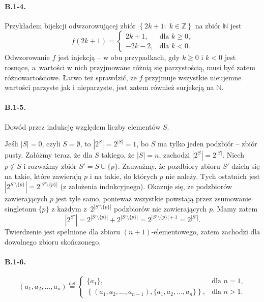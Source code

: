 \paragraph{B.1-4.}
Przykładem bijekcji odwzorowującej zbiór $\left\{2k+1:\;k\in\mathbb{Z}\right\}$ na zbiór $\mathbb{N}$ jest
\[
	f(2k+1) = \left\{\begin{array}{rl}
		2k+1, & \mbox{dla }k\ge 0,\\
		-2k-2, & \mbox{dla }k<0.
	\end{array}\right.
\]
Odwzorowanie $f$ jest injekcją -- w obu przypadkach, gdy $k\ge 0$ i $k<0$ jest rosnące, a~wartości w nich przyjmowane różnią się parzystością, musi być zatem różnowartościowe. Łatwo też sprawdzić, że $f$ przyjmuje wszystkie nieujemne wartości parzyste jak i nieparzyste, jest zatem również surjekcją na $\mathbb{N}$.

\paragraph{B.1-5.}
Dowód przez indukcję względem liczby elementów $S$.

Jeśli $|S|=0$, czyli $S=\emptyset$, to $\left|2^S\right|=2^{|S|}=1$, bo $S$ ma tylko jeden podzbiór -- zbiór pusty.
Załóżmy teraz, że dla $S$ takiego, że $|S|=n$, zachodzi $\left|2^S\right|=2^{|S|}$. Niech $p\not\in S$ i rozważmy zbiór $S'=S\cup\{ p\}$. Zauważmy, że pozdbiory zbioru $S'$ dzielą się na takie, które zawierają $p$ i na takie, do których $p$ nie należy. Tych ostatnich jest $\left|2^{S'\setminus\{ p\}}\right|=2^{\left|S'\setminus\{ p\}\right|}$ (z założenia indukcyjnego). Okazuje się, że podzbiorów zawierających $p$ jest tyle samo, ponieważ wszystkie powstają przez zsumowanie singletonu $\{ p\}$ z każdym z~$2^{\left|S'\setminus\{ p\}\right|}$ podzbiorów nie zawierających $p$. Mamy zatem
\[
	\left|2^{S'}\right|=2^{\left|S'\setminus\{ p\}\right|}+2^{\left|S'\setminus\{ p\}\right|} = 2^{\left|S'\setminus\{ p\}\right|+1} = 2^{\left|S'\right|}.
\]
Twierdzenie jest spełnione dla zbioru $(n+1)$-elementowego, zatem zachodzi dla dowolnego zbioru skończonego.

\paragraph{B.1-6.}
\[
	(a_1,a_2,\dots,a_n)\stackrel{\mathrm{def}}{=}\left\{\begin{array}{ll}
		\{ a_1\}, & \mbox{dla } n=1,\\
		\left\{(a_1,a_2,\dots,a_{n-1}),\{ a_1,a_2,\dots,a_n\}\right\}, & \mbox{dla }n>1.
	\end{array}\right.
\]

